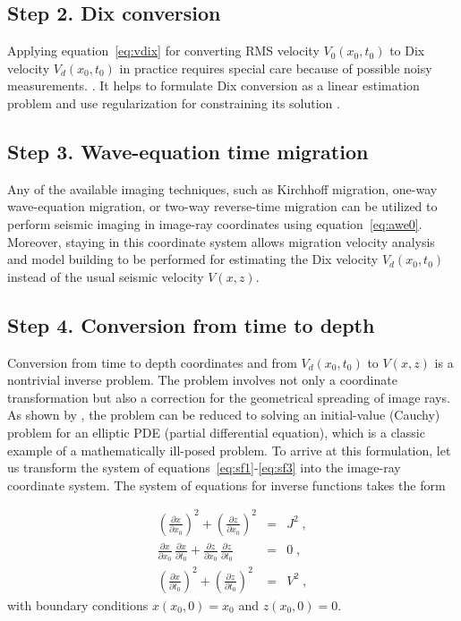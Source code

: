 \documentclass[manuscript]{geophysics}
\begin{document}
\subsection{Step 2. Dix conversion}

Applying equation~\ref{eq:vdix} for converting RMS velocity $V_0(x_0,t_0)$ to Dix velocity $V_d(x_0,t_0)$ in practice requires special care because of
possible noisy measurements. . It helps to formulate Dix conversion as a linear estimation problem and use regularization for constraining
its solution \cite[]{Clapp.sep.97.bob1,alejandro,pwc,shape}. 

\subsection{Step 3. Wave-equation time migration}

Any of the available imaging techniques, such as Kirchhoff migration,
one-way wave-equation migration, or two-way reverse-time
migration can be utilized to
perform seismic imaging in image-ray coordinates using
equation~\ref{eq:awe0}. Moreover, staying in this coordinate system
allows migration velocity analysis and model building to be performed
for estimating the Dix velocity $V_d(x_0,t_0)$ instead of the usual
seismic velocity $V(x,z)$.

\subsection{Step 4. Conversion from time to depth}

Conversion from time to depth coordinates and from $V_d(x_0,t_0)$ to
$V(x,z)$ is a nontrivial inverse problem. The problem involves not
only a coordinate transformation \cite[]{hatton,larner} but also a
correction for the geometrical spreading of image rays. As shown
by \cite{jcp}, the problem can be reduced to solving an initial-value
(Cauchy) problem for an elliptic PDE (partial differential equation),
which is a classic example of a mathematically ill-posed problem.
To arrive at this formulation, let us transform the system of
equations~\ref{eq:sf1}-\ref{eq:sf3} into the image-ray coordinate
system. The system of equations for inverse functions takes the form \cite[]{siwei2}

\begin{eqnarray}
\label{eq:igradx}
\left(\frac{\partial x}{\partial x_0}\right)^2 +  \left(\frac{\partial z}{\partial x_0}\right)^2 & = & J^2\;, \\
\label{eq:idotp}
\frac{\partial x}{\partial x_0}\,\frac{\partial x}{\partial t_0} + \frac{\partial z}{\partial x_0}\,\frac{\partial z}{\partial t_0} & = & 0\;, \\
\label{eq:igradt}
\left(\frac{\partial x}{\partial t_0}\right)^2 +  \left(\frac{\partial z}{\partial t_0}\right)^2 & = & V^2\;,
\end{eqnarray}
with boundary conditions $x(x_0,0) = x_0$ and $z(x_0,0) = 0$. 
\end{document}
